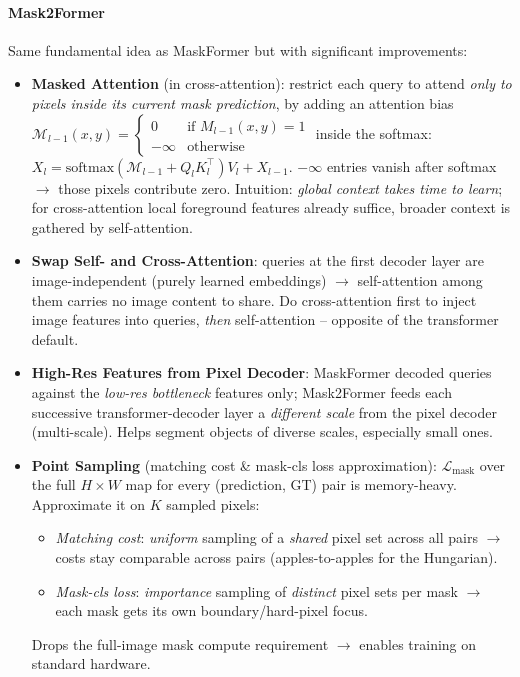 \documentclass{article}
\begin{document}
\paragraph{Mask2Former}
Same fundamental idea as MaskFormer but with significant improvements:
\begin{itemize}
    \item \textbf{Masked Attention} (in cross-attention): restrict each query to attend \textit{only to pixels inside its current mask prediction}, by adding an attention bias
    $\mathcal{M}_{l-1}(x,y) = \begin{cases} 0 & \text{if } M_{l-1}(x,y) = 1 \\ -\infty & \text{otherwise} \end{cases}$
    inside the softmax: $X_l = \text{softmax}(\mathcal{M}_{l-1} + Q_l K_l^\top)V_l + X_{l-1}$. $-\infty$ entries vanish after softmax $\rightarrow$ those pixels contribute zero. Intuition: \textit{global context takes time to learn}; for cross-attention local foreground features already suffice, broader context is gathered by self-attention.
    \item \textbf{Swap Self- and Cross-Attention}: queries at the first decoder layer are image-independent (purely learned embeddings) $\rightarrow$ self-attention among them carries no image content to share. Do cross-attention first to inject image features into queries, \textit{then} self-attention -- opposite of the transformer default.
    \item \textbf{High-Res Features from Pixel Decoder}: MaskFormer decoded queries against the \textit{low-res bottleneck} features only; Mask2Former feeds each successive transformer-decoder layer a \textit{different scale} from the pixel decoder (multi-scale). Helps segment objects of diverse scales, especially small ones.
    \item \textbf{Point Sampling} (matching cost \& mask-cls loss approximation): $\mathcal{L}_\text{mask}$ over the full $H\times W$ map for every (prediction, GT) pair is memory-heavy. Approximate it on $K$ sampled pixels:
    \begin{itemize}
        \item \textit{Matching cost}: \textit{uniform} sampling of a \textit{shared} pixel set across all pairs $\rightarrow$ costs stay comparable across pairs (apples-to-apples for the Hungarian).
        \item \textit{Mask-cls loss}: \textit{importance} sampling of \textit{distinct} pixel sets per mask $\rightarrow$ each mask gets its own boundary/hard-pixel focus.
    \end{itemize}
    Drops the full-image mask compute requirement $\rightarrow$ enables training on standard hardware.
\end{itemize}
\end{document}
